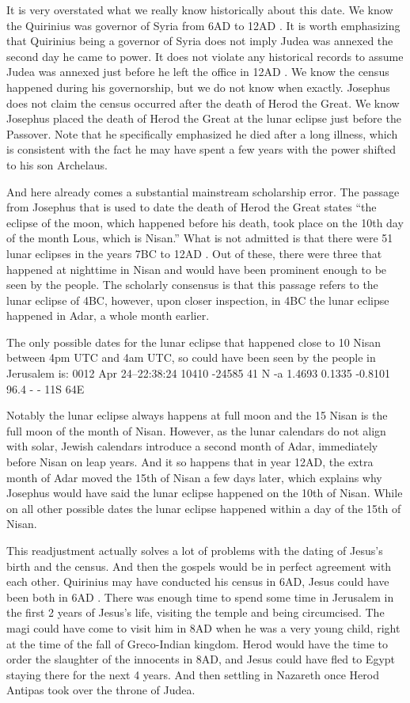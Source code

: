 It is very overstated what we really know historically about this date.
We know the Quirinius was governor of Syria from 6AD to 12AD .
It is worth emphasizing that Quirinius being a governor of Syria does not imply Judea was annexed the second day he came to power.
It does not violate any historical records to assume Judea was annexed just before he left the office in 12AD .
We know the census happened during his governorship, but we do not know when exactly.
Josephus does not claim the census occurred after the death of Herod the Great.
We know Josephus placed the death of Herod the Great at the lunar eclipse just before the Passover.
Note that he specifically emphasized he died after a long illness, which is consistent with the fact he may have spent a few years with the power shifted to his son Archelaus.

And here already comes a substantial mainstream scholarship error.
The passage from Josephus that is used to date the death of Herod the Great states ``the eclipse of the moon, which happened before his death, took place on the 10th day of the month Lous, which is Nisan.'' What is not admitted is that there were 51 lunar eclipses in the years 7BC to 12AD .
Out of these, there were three that happened at nighttime in Nisan and would have been prominent enough to be seen by the people.
The scholarly consensus is that this passage refers to the lunar eclipse of 4BC, however, upon closer inspection, in 4BC the lunar eclipse happened in Adar, a whole month earlier.

The only possible dates for the lunar eclipse that happened close to 10 Nisan between 4pm UTC and 4am UTC, so could have been seen by the people in Jerusalem is: 0012 Apr 24--22:38:24 10410 -24585 41 N -a 1.4693 0.1335 -0.8101 96.4 - - 11S 64E

Notably the lunar eclipse always happens at full moon and the 15 Nisan is the full moon of the month of Nisan.
However, as the lunar calendars do not align with solar, Jewish calendars introduce a second month of Adar, immediately before Nisan on leap years.
And it so happens that in year 12AD, the extra month of Adar moved the 15th of Nisan a few days later, which explains why Josephus would have said the lunar eclipse happened on the 10th of Nisan.
While on all other possible dates the lunar eclipse happened within a day of the 15th of Nisan.

This readjustment actually solves a lot of problems with the dating of Jesus's birth and the census.
And then the gospels would be in perfect agreement with each other.
Quirinius may have conducted his census in 6AD, Jesus could have been both in 6AD .
There was enough time to spend some time in Jerusalem in the first 2 years of Jesus's life, visiting the temple and being circumcised.
The magi could have come to visit him in 8AD when he was a very young child, right at the time of the fall of Greco-Indian kingdom.
Herod would have the time to order the slaughter of the innocents in 8AD, and Jesus could have fled to Egypt staying there for the next 4 years.
And then settling in Nazareth once Herod Antipas took over the throne of Judea.

